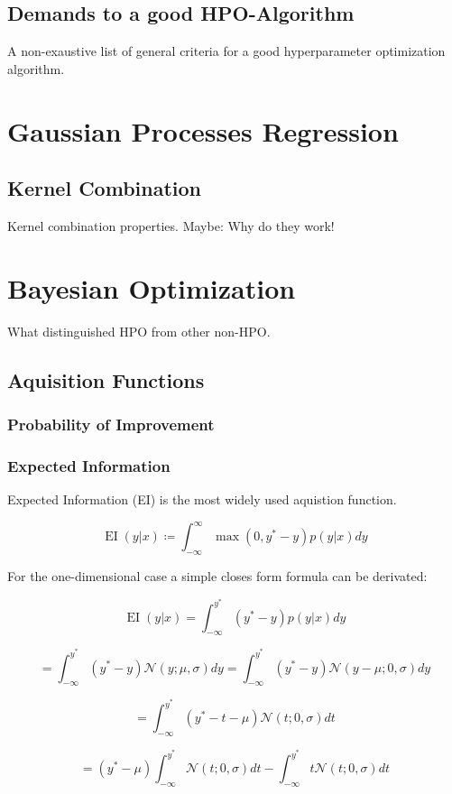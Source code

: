 \documentclass[english]{article}
\newcommand{\EI}{\operatorname{EI}}
\newcommand{\normal}{\mathcal{N}}
\begin{document}
\begin{definition}[Topology]
\subsection{Demands to a good HPO-Algorithm}
A non-exaustive list of general criteria for a good hyperparameter optimization algorithm.

\section{Gaussian Processes Regression}
\subsection{Kernel Combination}
Kernel combination properties. Maybe: Why do they work!

\section{Bayesian Optimization}
What distinguished HPO from other non-HPO.

\subsection{Aquisition Functions}

\subsubsection{Probability of Improvement}
\subsubsection{Expected Information}

Expected Information (EI) is the most widely used aquistion function.

$$ \EI(y|x) \coloneqq \int_{-\infty}^{\infty} \max(0, y^*-y)p(y|x)dy $$

For the one-dimensional case a simple closes form formula can be derivated:

$$ \EI(y|x) = \int_{-\infty}^{y^*}(y^*-y)p(y|x)dy$$

$$ = \int_{-\infty}^{y^*}(y^*-y)\normal(y; \mu, \sigma)dy =
\int_{-\infty}^{y^*}(y^*-y)\normal(y-\mu; 0, \sigma)dy$$

$$ = \int_{-\infty}^{y^*}(y^*- t - \mu)\normal(t; 0, \sigma)dt $$

$$ = (y^*-\mu)\int_{-\infty}^{y^*}\normal(t; 0, \sigma)dt - \int_{-\infty}^{y^*}t\normal(t; 0, \sigma)dt$$


\end{definition}
\end{document}
